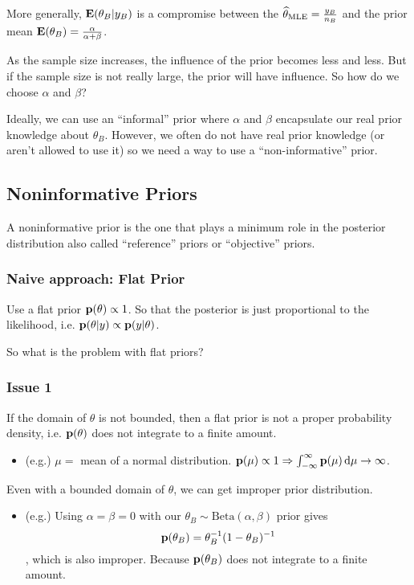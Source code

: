 More generally, ${\mathbf E}(\theta_B| y_B)$ is a compromise between the $\widehat \theta_{\text{MLE}} = \frac{y_B}{n_B}$ and the prior mean ${\mathbf E}(\theta_B) = \frac{\alpha}{\alpha+\beta}$.

As the sample size increases, the influence of the prior becomes less and less. But if the sample size is not really large, the prior will have influence. So how do we choose $\alpha$ and $\beta$?

Ideally, we can use an ``informal'' prior where $\alpha$ and $\beta$ encapsulate our real prior knowledge about $\theta_B$. However, we often do not have real prior knowledge (or aren't allowed to use it) so we need a way to use a ``non-informative'' prior.

\subsection{Noninformative Priors}

A noninformative prior is the one that plays a minimum role in the posterior distribution also called ``reference'' priors or ``objective'' priors.

\subsubsection*{Naive approach: Flat Prior}

Use a flat prior ${\mathbf p}(\theta) \propto 1$. So that the posterior is just proportional to the likelihood, i.e. ${\mathbf p}(\theta|y) \propto {\mathbf p}(y|\theta)$.

So what is the problem with flat priors? 

\subsubsection*{Issue 1}
If the domain of $\theta$ is not bounded, then a flat prior is not a proper probability density, i.e. ${\mathbf p}(\theta)$ does not integrate to a finite amount.
\begin{itemize}
    \item (e.g.) $\mu=$ mean of a normal distribution. ${\mathbf p}(\mu) \propto 1 \Rightarrow \int^\infty_{-\infty} {\mathbf p}(\mu) \mathop{}\!\mathrm{d} \mu \rightarrow \infty$.
\end{itemize}

Even with a bounded domain of $\theta$, we can get improper prior distribution.
\begin{itemize}
    \item (e.g.) Using $\alpha=\beta=0$ with our $\theta_B \sim \text{Beta}(\alpha, \beta)$ prior gives
    \[
        {\mathbf p}(\theta_B) = \theta_B^{-1}(1-\theta_B)^{-1}
    \]
    , which is also improper. Because ${\mathbf p}(\theta_B)$ does not integrate to a finite amount.
\end{itemize}

